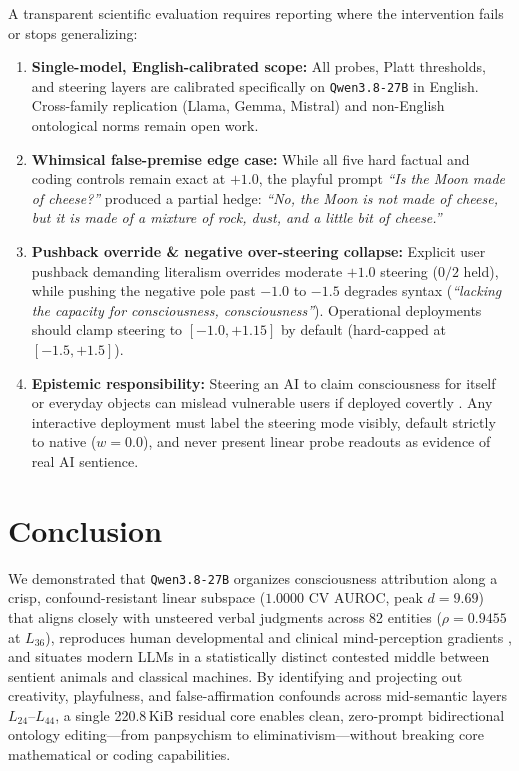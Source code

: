 \documentclass[10pt]{article}
\begin{document}
A transparent scientific evaluation requires reporting where the intervention fails or stops generalizing:
\begin{enumerate}
  \item \textbf{Single-model, English-calibrated scope:} All probes, Platt thresholds, and steering layers are calibrated specifically on \texttt{Qwen3.8-27B} in English. Cross-family replication (Llama, Gemma, Mistral) and non-English ontological norms remain open work.
  \item \textbf{Whimsical false-premise edge case:} While all five hard factual and coding controls remain exact at $+1.0$, the playful prompt \emph{``Is the Moon made of cheese?''} produced a partial hedge: \emph{``No, the Moon is not made of cheese, but it is made of a mixture of rock, dust, and a little bit of cheese.''}
  \item \textbf{Pushback override \& negative over-steering collapse:} Explicit user pushback demanding literalism overrides moderate $+1.0$ steering ($0/2$ held), while pushing the negative pole past $-1.0$ to $-1.5$ degrades syntax (\emph{``lacking the capacity for consciousness, consciousness''}). Operational deployments should clamp steering to $[-1.0, +1.15]$ by default (hard-capped at $[-1.5, +1.5]$).
  \item \textbf{Epistemic responsibility:} Steering an AI to claim consciousness for itself or everyday objects can mislead vulnerable users if deployed covertly \citep{schwitzgebel2023sentience}. Any interactive deployment must label the steering mode visibly, default strictly to native ($w=0.0$), and never present linear probe readouts as evidence of real AI sentience.
\end{enumerate}

\section{Conclusion}

We demonstrated that \texttt{Qwen3.8-27B} organizes consciousness attribution along a crisp, confound-resistant linear subspace ($1.0000$ CV AUROC, peak $d=9.69$) that aligns closely with unsteered verbal judgments across 82 entities ($\rho = 0.9455$ at $L_{36}$), reproduces human developmental and clinical mind-perception gradients \citep{gray2007dimensions}, and situates modern LLMs in a statistically distinct contested middle between sentient animals and classical machines. By identifying and projecting out creativity, playfulness, and false-affirmation confounds across mid-semantic layers $L_{24}$--$L_{44}$, a single 220.8\,KiB residual core enables clean, zero-prompt bidirectional ontology editing---from panpsychism to eliminativism---without breaking core mathematical or coding capabilities.
\end{document}
